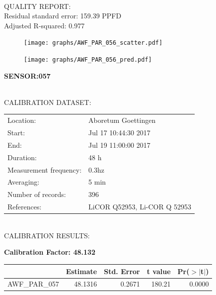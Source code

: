 \documentclass[oneside]{report}
\begin{document}
\hrulefill\\
QUALITY REPORT:\\
Residual standard error: 159.39 PPFD\\
Adjusted R-squared: 0.977



\begin{figure}[H]
  \centering
  \texttt{[image: graphs/AWF\_PAR\_056\_scatter.pdf]}
\end{figure}




\begin{figure}[H]
  \centering
  \texttt{[image: graphs/AWF\_PAR\_056\_pred.pdf]}
\end{figure}

\pagebreak


\begin{center}
\large{\textbf{SENSOR:057}}\\
\end{center}

\hrulefill\\
CALIBRATION DATASET:\\
\begin{table}[h!]
  \centering
  \label{tab:table1}
  \begin{tabular}{ll}
    Location: & Aboretum Goettingen\\ 
    
    
    Start:  & Jul 17 10:44:30 2017 \\
    End:   & Jul 19 11:00:00 2017\\ 
    Duration: & 48 h\\
    Measurement frequency: & 0.3hz\\
    Averaging:  &5 min\\
    Number of records: & 396 \\
    References: & LiCOR Q52953, Li-COR Q 52953 \\
  \end{tabular}
\end{table}

\hrulefill\\
CALIBRATION RESULTS:\\


\begin{center}
\textbf{\large{Calibration Factor: 48.132}}\\
\end{center}
\begin{table}[ht]
\centering
\begin{tabular}{rrrrr}
  \hline
 & Estimate & Std. Error & t value & Pr($>$$|$t$|$) \\ 
  \hline
AWF\_PAR\_057 & 48.1316 & 0.2671 & 180.21 & 0.0000 \\ 
   \hline
\end{tabular}
\end{table}
\end{document}
